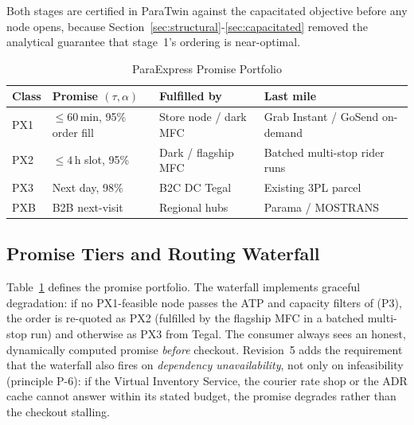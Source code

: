 Both stages are certified in ParaTwin against the capacitated objective before any node opens, because Section~\ref{sec:structural}-\ref{sec:capacitated} removed the analytical guarantee that stage~1's ordering is near-optimal.

\begin{table}[t]
\caption{ParaExpress Promise Portfolio}
\label{tab:promise}
\centering\footnotesize
\begin{tabular}{@{}lp{1.55cm}p{1.5cm}p{2.0cm}@{}}
\toprule
\textbf{Class} & \textbf{Promise $(\tau,\alpha)$} & \textbf{Fulfilled by} & \textbf{Last mile}\\
\midrule
PX1 & $\le60$\,min, 95\% order fill & Store node / dark MFC & Grab Instant / GoSend on-demand\\
PX2 & $\le4$\,h slot, 95\% & Dark / flagship MFC & Batched multi-stop rider runs\\
PX3 & Next day, 98\% & B2C DC Tegal & Existing 3PL parcel\\
PXB & B2B next-visit & Regional hubs & Parama / MOSTRANS\\
\bottomrule
\end{tabular}
\end{table}

\subsection{Promise Tiers and Routing Waterfall}
Table~\ref{tab:promise} defines the promise portfolio. The waterfall implements graceful degradation: if no PX1-feasible node passes the ATP and capacity filters of (P3), the order is re-quoted as PX2 (fulfilled by the flagship MFC in a batched multi-stop run) and otherwise as PX3 from Tegal. The consumer always sees an honest, dynamically computed promise \emph{before} checkout. Revision~5 adds the requirement that the waterfall also fires on \emph{dependency unavailability}, not only on infeasibility (principle P-6): if the Virtual Inventory Service, the courier rate shop or the ADR cache cannot answer within its stated budget, the promise degrades rather than the checkout stalling.
